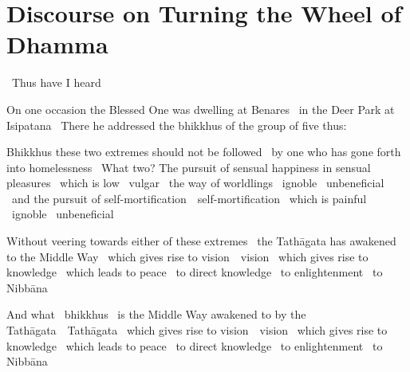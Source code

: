 
\section{Discourse on Turning the Wheel of Dhamma}
\label{wheel-of-dhamma-full}

\begin{leader-english}
  \anglebracketleft\ \hspace{-0.5mm}Thus have I heard \hspace{-0.5mm}\anglebracketright\
\end{leader-english}

\begin{english-only-hang}
  On one occasion the Blessed One was dwelling at Benares \breathmark\ in the Deer Park at Isipatana \breathmark\ There he addressed the bhikkhus of the group of five thus:
\end{english-only-hang}

\begin{english-only-hang}
  Bhikkhus these two extremes should not be followed \breathmark\ by one who has gone forth into homelessness \breathmark\ What two? The pursuit of sensual happiness in sensual pleasures \breathmark\ which is low \breathmark\ vulgar \breathmark\ the way of worldlings \breathmark\ ignoble \breathmark\ unbeneficial \breathmark\ and the pursuit of \ifbfiveversion \mbox{self-mortification}~\breathmark\ \else self-mortification \breathmark\ \fi which is painful \breathmark\ ignoble \breathmark\ unbeneficial
\end{english-only-hang}

\begin{english-only-hang}
  Without veering towards either of these extremes \breathmark\ the Tathāgata has awakened to the Middle Way \breathmark\ which gives rise to \ifbfiveversion \mbox{vision}~\breathmark\ \else vision \breathmark\ \fi which gives rise to knowledge \breathmark\ which leads to peace \breathmark\ to direct knowledge \breathmark\ to enlightenment \breathmark\ to Nibbāna
\end{english-only-hang}

\begin{english-only-hang}
  And what \breathmark\ bhikkhus \breathmark\ is the Middle Way awakened to by the \ifbfiveversion \mbox{Tathāgata}~\breathmark\ Tathāgata \breathmark\ \fi which gives rise to \ifbfiveversion \mbox{vision}~\breathmark\ \else vision \breathmark\ \fi which gives rise to knowledge \breathmark\ which leads to peace \breathmark\ to direct knowledge \breathmark\ to enlightenment \breathmark\ to Nibbāna
\end{english-only-hang}

